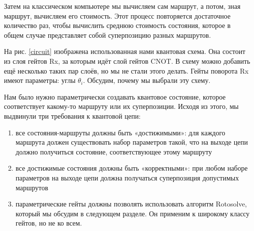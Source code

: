 Затем на классическом компьютере мы вычисляем сам маршрут, а потом, зная маршрут, вычисляем его стоимость. Этот процесс повторяется достаточное количество раз, чтобы вычислить среднюю стоимость состояния, которое в общем случае представляет собой суперпозицию разных маршрутов.





На рис. \ref{circuit} изображена использованная нами квантовая схема. Она состоит из слоя гейтов Rx, за которым идёт слой гейтов CNOT. 
В схему можно добавить ещё несколько таких пар слоёв, но мы не стали этого делать.
Гейты поворота Rx имеют параметры: углы $\theta_i$. Обсудим, почему мы выбрали эту схему.


Нам было нужно параметрически создавать квантовое состояние, которое соответствует какому-то маршруту или их суперпозиции. Исходя из этого, мы выдвинули три требования к квантовой цепи:

\begin{enumerate}
    \item все состояния-маршруты должны быть «достижимыми»: для каждого маршрута должен существовать набор параметров такой, что на выходе цепи должно получиться состояние, соответствующее этому маршруту 

    \item все достижимые состояния должны быть «корректными»: при любом наборе параметров на выходе цепи должна получаться суперпозиция допустимых маршрутов
    

    \item параметрические гейты должны позволять использовать алгоритм Rotosolve, который мы обсудим в следующем разделе. Он применим к широкому классу гейтов, но не ко всем.
\end{enumerate}


